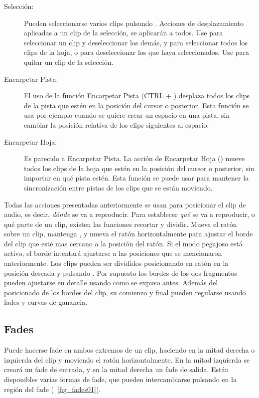 \begin{description}
  \item[Selección:] Pueden seleccionarse varios clips pulsando . Acciones de desplazamiento  aplicadas a un clip de la selección, se aplicarán a todos. Use  para seleccionar un clip y deseleccionar los demás, y  para seleccionar todos los clips de la hoja, o para deseleccionar los que haya seleccionados. Use  para quitar un clip de la selección.
  \item[Encarpetar Pista:] El uso de la función Encarpetar Pista (CTRL $+$ ) desplaza todos los clips de la pista que estén en la posición del cursor o posterior. Esta función se usa por ejemplo cuando se quiere crear un espacio en una pista, sin cambiar la posición relativa de los clips siguientes al espacio.
  \item[Encarpetar Hoja:] Es parecido a Encarpetar Pista. La acción de Encarpetar Hoja () mueve todos los clips de la hoja que estén en la posición del cursor o posterior, sin importar en qué pista estén. Esta función se puede usar para mantener la sincronización entre pistas de los clips que se están moviendo.
\end{description}

Todas las acciones presentadas anteriormente se usan para posicionar el clip de audio, es decir, \emph{dónde} se va a reproducir. Para establecer \emph{qué} se va a reproducir, o qué parte de un clip, existen las funciones recortar y dividir. Mueva el ratón sobre un clip, mantenga , y mueva el ratón horizontalmente para ajustar el borde del clip que esté mas cercano a la posición del ratón. Si el modo pegajoso está activo, el borde intentará ajustarse a las posiciones que se mencionaron anteriormente. Los clips pueden ser divididos posicionando en ratón en la posición deseada y pulsando . Por supuesto los bordes de los dos fragmentos pueden ajustarse en detalle usando  como se expuso antes. Además del posicionado de los bordes del clip, su comienzo y final pueden regularse usando fades y curvas de ganancia.

\subsection{Fades}
Puede hacerse fade en ambos extremos de un clip, haciendo  en la mitad derecha o izquierda del clip y moviendo el ratón horizontalmente. En la mitad izquierda se creará un fade de entrada, y en la mitad derecha un fade de salida. Están disponibles varias formas de fade, que pueden intercambiarse pulsando  en la región del fade (\FigB~\ref{fig_fades01}).

